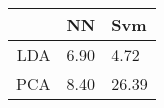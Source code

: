 \begin{tabular}{|r|l|l|}
  \hline
    & NN & Svm \\
  \hline
  LDA & 6.90 & 4.72 \\
  \hline
  PCA & 8.40 & 26.39 \\
  \hline
\end{tabular}
